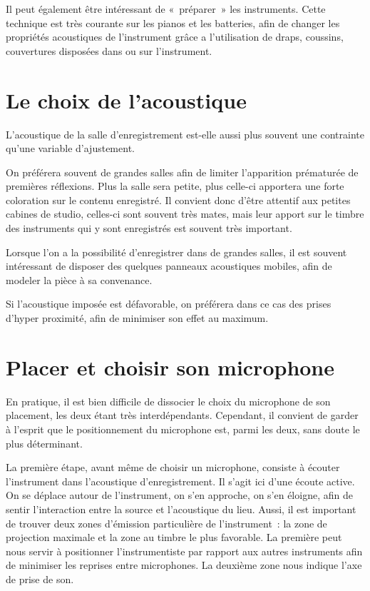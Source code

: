 \documentclass[
]{book}
\begin{document}
Il peut également être intéressant de «~préparer~» les instruments. Cette technique est très courante sur les pianos et les batteries, afin de changer les propriétés acoustiques de l'instrument grâce a l'utilisation de draps, coussins, couvertures disposées dans ou sur l'instrument.

\hypertarget{le-choix-de-lacoustique}{%
\section{Le choix de l'acoustique}\label{le-choix-de-lacoustique}}

L'acoustique de la salle d'enregistrement est-elle aussi plus souvent une contrainte qu'une variable d'ajustement.

On préférera souvent de grandes salles afin de limiter l'apparition prématurée de premières réflexions. Plus la salle sera petite, plus celle-ci apportera une forte coloration sur le contenu enregistré. Il convient donc d'être attentif aux petites cabines de studio, celles-ci sont souvent très mates, mais leur apport sur le timbre des instruments qui y sont enregistrés est souvent très important.

Lorsque l'on a la possibilité d'enregistrer dans de grandes salles, il est souvent intéressant de disposer des quelques panneaux acoustiques mobiles, afin de modeler la pièce à sa convenance.

Si l'acoustique imposée est défavorable, on préférera dans ce cas des prises d'hyper proximité, afin de minimiser son effet au maximum.

\hypertarget{placer-et-choisir-son-microphone}{%
\section{Placer et choisir son microphone}\label{placer-et-choisir-son-microphone}}

En pratique, il est bien difficile de dissocier le choix du microphone de son placement, les deux étant très interdépendants. Cependant, il convient de garder à l'esprit que le positionnement du microphone est, parmi les deux, sans doute le plus déterminant.

La première étape, avant même de choisir un microphone, consiste à écouter l'instrument dans l'acoustique d'enregistrement. Il s'agit ici d'une écoute active. On se déplace autour de l'instrument, on s'en approche, on s'en éloigne, afin de sentir l'interaction entre la source et l'acoustique du lieu. Aussi, il est important de trouver deux zones d'émission particulière de l'instrument~: la zone de projection maximale et la zone au timbre le plus favorable. La première peut nous servir à positionner l'instrumentiste par rapport aux autres instruments afin de minimiser les reprises entre microphones. La deuxième zone nous indique l'axe de prise de son.
\end{document}
